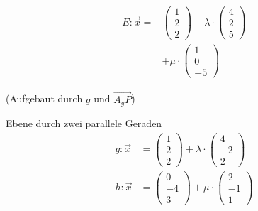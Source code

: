 \documentclass[paper=a6,ngerman,twoside=true,fontsize=14pt, parskip = half]{scrartcl}
\begin{document}
\begin{antwort}
	\begin{align*}
	E:\vec{x}=&\left(\begin{array}{c} 1 \\ 2 \\ 2\end{array} \right)+\lambda \cdot \left(\begin{array}{c} 4 \\ 2 \\ 5\end{array} \right)\\
	&+\mu \cdot \left(\begin{array}{c} 1 \\0 \\ -5\end{array} \right)
	\end{align*}
	\begin{center}
	(Aufgebaut durch $g$ und $\vec{A_gP}$)
	\end{center}
\end{antwort}	
\begin{frage}
	Ebene durch zwei parallele Geraden
	\begin{align*}
	g:\vec{x}&=\left(\begin{array}{c} 1 \\ 2 \\ 2\end{array} \right)+\lambda \cdot \left(\begin{array}{c} 4 \\ -2 \\ 2\end{array} \right)\\
	h:\vec{x}&=\left(\begin{array}{c} 0 \\ -4 \\ 3\end{array} \right)+\mu \cdot \left(\begin{array}{c} 2 \\ -1 \\ 1\end{array} \right)
	\end{align*}
\end{frage}
\end{document}
